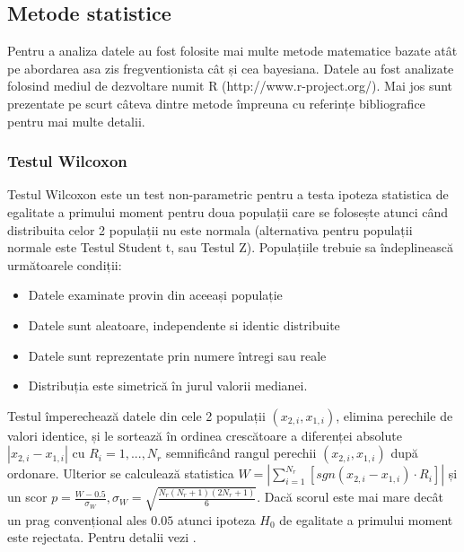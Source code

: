 \documentclass[11pt,draft]{article}
\begin{document}
\subsection{Metode statistice}
  Pentru a analiza datele au fost folosite mai multe metode matematice bazate atât pe abordarea asa zis fregventionista cât și cea bayesiana. Datele au fost analizate folosind mediul de dezvoltare numit R (http://www.r-project.org/). Mai jos sunt prezentate pe scurt câteva dintre metode împreuna cu referințe bibliografice pentru mai multe detalii.

\subsubsection{Testul Wilcoxon}
 Testul Wilcoxon este un test non-parametric pentru a testa ipoteza statistica de egalitate a primului moment pentru doua populații care se folosește atunci când distribuita celor 2 populații nu este normala (alternativa pentru populații normale este Testul Student t, sau Testul Z). 
 Populațiile trebuie sa îndeplinească următoarele condiții:
 \begin{itemize}
  \item Datele examinate provin din aceeași populație
  \item Datele sunt aleatoare, independente si identic distribuite
  \item Datele sunt reprezentate prin numere întregi sau reale
  \item Distribuția este simetrică în jurul valorii medianei.
 \end{itemize}
  Testul împerechează datele din cele 2 populații $(x_{2,i},x_{1,i})$, elimina perechile de valori identice, și le sortează în ordinea crescătoare a diferenței absolute $|x_{2,i}-x_{1,i}|$ cu $R_i=1, ..., N_r$ semnificând rangul perechii $(x_{2,i},x_{1,i})$ după ordonare. 
  Ulterior se calculează statistica $W = |\sum_{i=1}^{N_r} [sgn(x_{2,i} - x_{1,i}) \cdot R_i]| $ și un scor $p = \frac{W - 0.5}{\sigma_W}, \sigma_W = \sqrt{\frac{N_r(N_r + 1)(2N_r + 1)}{6}}$. 
  Dacă scorul este mai mare decât un prag convențional ales $0.05$ atunci ipoteza $H_0$ de egalitate a primului moment este rejectata. 
  Pentru detalii vezi \citep{wilcoxon45,siegel56}.
\end{document}
